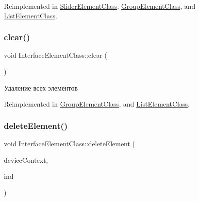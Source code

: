 Reimplemented in \hyperlink{class_slider_element_class_aab0bdceef3fb3407c0d56d0011806a21}{Slider\+Element\+Class}, \hyperlink{class_group_element_class_aa7a5120c46e4f73cbc818c2835b3e40a}{Group\+Element\+Class}, and \hyperlink{class_list_element_class_a8a8930b7a1872ec1aa78be2a1fe4adc6}{List\+Element\+Class}.

\mbox{\label{class_interface_element_class_a0bc6d608e1d1c6bebb6507b7f9a8a220}} 
\subsubsection{\texorpdfstring{clear()}{clear()}}
{\footnotesize\ttfamily void Interface\+Element\+Class\+::clear (\begin{DoxyParamCaption}{ }\end{DoxyParamCaption})\hspace{0.3cm}{\ttfamily [virtual]}}



Удаление всех элементов 



Reimplemented in \hyperlink{class_group_element_class_a162a930551375f92238a3d1604e05e6a}{Group\+Element\+Class}, and \hyperlink{class_list_element_class_a3c18a56481ec0a07b834eeccf111ea95}{List\+Element\+Class}.

\mbox{\label{class_interface_element_class_ab8f17e3c917732a8d2ef85cb0cd65eda}} 
\subsubsection{\texorpdfstring{delete\+Element()}{deleteElement()}}
{\footnotesize\ttfamily void Interface\+Element\+Class\+::delete\+Element (\begin{DoxyParamCaption}\item[{I\+D3\+D11\+Device\+Context $\ast$}]{device\+Context,  }\item[{int}]{ind }\end{DoxyParamCaption})\hspace{0.3cm}{\ttfamily [virtual]}}




